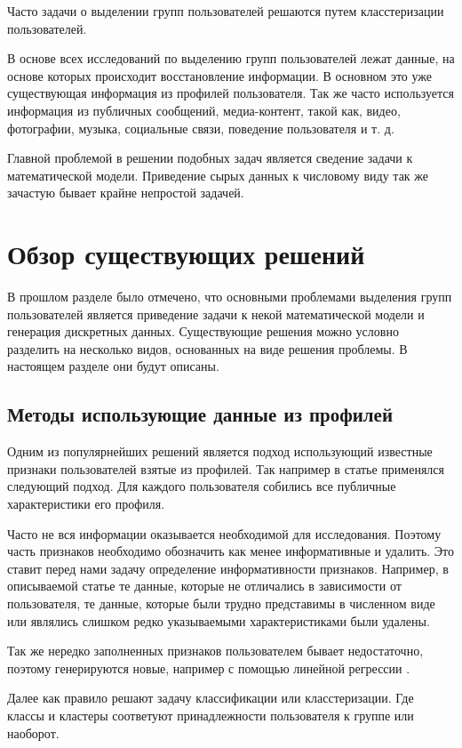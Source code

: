 \documentclass[annotation,times,page4]{itmo-student-thesis}
\begin{document}
Часто задачи о выделении групп пользователей решаются путем класстеризации пользователей.

В основе всех исследований по выделению групп пользователей лежат данные, на основе которых происходит восстановление информации. В основном это уже существующая информация из профилей пользователя. Так же часто используется информация из публичных сообщений, медиа-контент, такой как, видео, фотографии, музыка, социальные связи, поведение пользователя и т. д.

Главной проблемой в решении подобных задач является сведение задачи к математической модели. Приведение сырых данных к числовому виду так же зачастую бывает крайне непростой задачей.
  
\section{Обзор существующих решений}
В прошлом разделе было отмечено, что основными проблемами выделения групп пользователей является приведение задачи к некой математической модели и генерация дискретных данных. Существующие решения можно условно разделить на несколько видов, основанных на виде решения проблемы. В настоящем разделе они будут описаны.
\subsection{Методы использующие данные из профилей}
Одним из популярнейших решений является подход использующий известные признаки пользователей взятые из профилей. Так например в статье \cite{golbeck2011predicting} применялся следующий подход. Для каждого пользователя собились все публичные характеристики его профиля. 

Часто не вся информации оказывается необходимой для исследования. Поэтому часть признаков необходимо обозначить как менее информативные и удалить. Это ставит перед нами задачу определение информативности признаков. Например, в описываемой статье те данные, которые не отличались в зависимости от пользователя, те данные, которые были трудно представимы в численном виде или являлись слишком редко указываемыми характеристиками были удалены.
 
Так же нередко заполненных признаков пользователем бывает недостаточно, поэтому генерируются новые, например с помощью линейной регрессии \cite{golbeck2011predicting}.

Далее как правило решают задачу классификации или класстеризации. Где классы и кластеры соответуют принадлежности пользователя к группе или наоборот.
\end{document}
